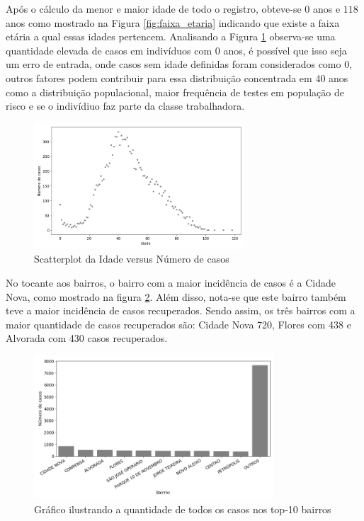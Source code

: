 \documentclass[12pt]{article}
\begin{document}
Após o cálculo da menor e maior idade de todo o registro, obteve-se $0$ anos e $118$ anos como mostrado na Figura \ref{fig:faixa_etaria} indicando que existe a faixa etária a qual essas idades pertencem. Analisando a Figura \ref{fig:scatter} observa-se uma quantidade elevada de casos em indivíduos com 0 anos, é possível que isso seja um erro de entrada, onde casos sem idade definidas foram considerados como 0, outros fatores podem contribuir para essa distribuição concentrada em 40 anos como a distribuição populacional, maior frequência de testes em população de risco e se o indivídiuo faz parte da classe trabalhadora.


\begin{figure}[h!]
    \centering
    \includegraphics[width=0.7\textwidth]{scatterplot_idade.png}
    \caption{Scatterplot da Idade versus Número de casos }
    \label{fig:scatter}
\end{figure}



No tocante aos bairros, o bairro com a maior incidência de casos é a Cidade Nova, como mostrado na figura \ref{fig:top10_bairros}. Além disso, nota-se que este bairro também teve a maior incidência de casos recuperados. Sendo assim, os três bairros com a maior quantidade de casos recuperados são: Cidade Nova 720, Flores com 438 e Alvorada com 430 casos recuperados.


\begin{figure}[h!]
    \centering
    \includegraphics[width=0.8\textwidth]{top10_bairros.png}
    \caption{Gráfico ilustrando a quantidade de todos os casos nos top-10 bairros}
    \label{fig:top10_bairros}
\end{figure}
\end{document}
